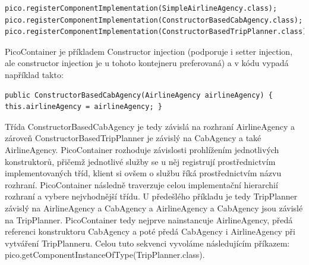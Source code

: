 \documentclass[a4paper,conference]{IEEEtran}
\begin{document}
\lstset{language=Java,caption=Registrace tříd v kontejneru,label=listing:Java}
\begin{lstlisting}
pico.registerComponentImplementation(SimpleAirlineAgency.class); pico.registerComponentImplementation(ConstructorBasedCabAgency.class); pico.registerComponentImplementation(ConstructorBasedTripPlanner.class);
\end{lstlisting}

PicoContainer je příkladem Constructor injection (podporuje i setter injection, ale constructor injection je u tohoto kontejneru preferovaná) a v kódu vypadá například takto:

\lstset{language=Java,caption=Použití PicoContainer,label=listing:Java}
\begin{lstlisting}
public ConstructorBasedCabAgency(AirlineAgency airlineAgency) {  this.airlineAgency = airlineAgency; }
\end{lstlisting}

Třída ConstructorBasedCabAgency je tedy závislá na rozhraní AirlineAgency a zároveň ConstructorBasedTripPlanner je závislý na CabAgency a také AirlineAgency.
PicoContainer rozhoduje závislosti prohlížením jednotlivých konstruktorů, přičemž jednotlivé služby se u něj registrují prostřednictvím implementovaných tříd, klient si ovšem o službu říká prostřednictvím názvu rozhraní. PicoContainer následně traverzuje celou implementační hierarchií rozhraní a vybere nejvhodnější třídu.
U předešlého příkladu je tedy TripPlanner závislý na AirlineAgency a CabAgency a AirlineAgency a CabAgency jsou závislé na TripPlanner. PicoContainer tedy nejprve nainstancuje AirlineAgency, předá referenci konstruktoru CabAgency a poté předá CabAgency i AirlineAgency při vytváření TripPlanneru. Celou tuto sekvenci vyvoláme následujícím příkazem: pico.getComponentInstanceOfType(TripPlanner.class).



% 
% 
% 
% 




\end{document}
